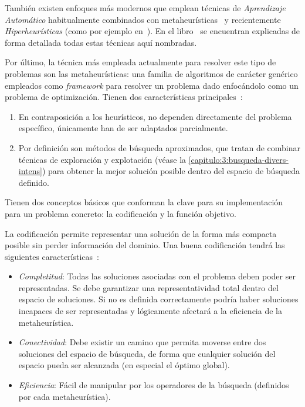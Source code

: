 También existen enfoques más modernos que emplean técnicas de \textit{Aprendizaje Automático} habitualmente combinados con metaheurísticas~\cite{sota:machine-learning-geneticos} y recientemente \textit{Hiperheurísticas} (como por ejemplo en~\cite{sota:hiperheuristicas}). En el libro~\cite{sota:libro-sota-scheduling} se encuentran explicadas de forma detallada todas estas técnicas aquí nombradas.

Por último, la técnica más empleada actualmente para resolver este tipo de problemas son las metaheurísticas: una familia de algoritmos de carácter genérico empleados como \textit{framework} para resolver un problema dado enfocándolo como un problema de optimización. Tienen dos características principales~\cite{sota:metaheuristicas}:

\begin{enumerate}
    \item En contraposición a los heurísticos, no dependen directamente del problema específico, únicamente han de ser adaptados parcialmente.
    \item Por definición son métodos de búsqueda aproximados, que tratan de combinar técnicas de exploración y explotación (véase la \autoref{capitulo:3:busqueda-divers-intens}) para obtener la mejor solución posible dentro del espacio de búsqueda definido.
\end{enumerate}

Tienen dos conceptos básicos que conforman la clave para su implementación para un problema concreto: la codificación y la función objetivo.

La codificación permite representar una solución de la forma más compacta posible sin perder información del dominio. Una buena codificación tendrá las siguientes características~\cite{sota:metaheuristicas-design-impl}:

\begin{itemize}
    \item \textit{Completitud}: Todas las soluciones asociadas con el problema deben poder ser representadas. Se debe garantizar una representatividad total dentro del espacio de soluciones. Si no es definida correctamente podría haber soluciones incapaces de ser representadas y lógicamente afectará a la eficiencia de la metaheurística.
    \item \textit{Conectividad}: Debe existir un camino que permita moverse entre dos soluciones del espacio de búsqueda, de forma que cualquier solución del espacio pueda ser alcanzada (en especial el óptimo global).
    \item \textit{Eficiencia}: Fácil de manipular por los operadores de la búsqueda (definidos por cada metaheurística).
\end{itemize}

